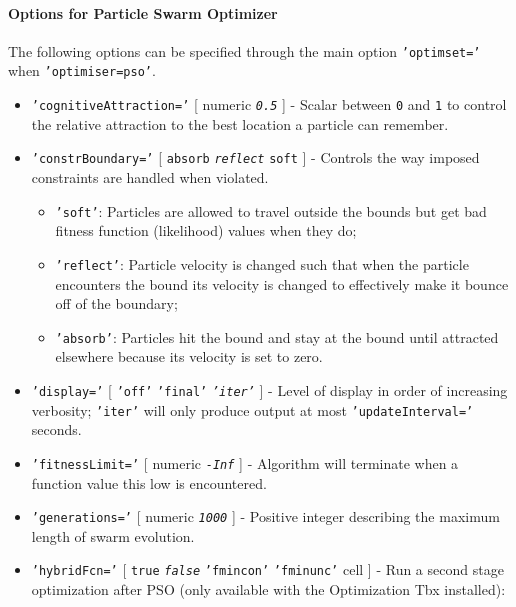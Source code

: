 \paragraph{Options for Particle Swarm
Optimizer}

The following options can be specified through the main option
\texttt{'optimset='} when \texttt{'optimiser=pso'}.

\begin{itemize}
\item
  \texttt{'cognitiveAttraction='} {[} numeric \textbar{}
  \emph{\texttt{0.5}} {]} - Scalar between \texttt{0} and \texttt{1} to
  control the relative attraction to the best location a particle can
  remember.
\item
  \texttt{'constrBoundary='} {[} \texttt{absorb} \textbar{}
  \emph{\texttt{reflect}} \textbar{} \texttt{soft} {]} - Controls the
  way imposed constraints are handled when violated.

  \begin{itemize}
  \item
    \texttt{'soft'}: Particles are allowed to travel outside the bounds
    but get bad fitness function (likelihood) values when they do;
  \item
    \texttt{'reflect'}: Particle velocity is changed such that when the
    particle encounters the bound its velocity is changed to effectively
    make it bounce off of the boundary;
  \item
    \texttt{'absorb'}: Particles hit the bound and stay at the bound
    until attracted elsewhere because its velocity is set to zero.
  \end{itemize}
\item
  \texttt{'display='} {[} \texttt{'off'} \textbar{} \texttt{'final'}
  \textbar{} \emph{\texttt{'iter'}} {]} - Level of display in order of
  increasing verbosity; \texttt{'iter'} will only produce output at most
  \texttt{'updateInterval='} seconds.
\item
  \texttt{'fitnessLimit='} {[} numeric \textbar{} \emph{\texttt{-Inf}}
  {]} - Algorithm will terminate when a function value this low is
  encountered.
\item
  \texttt{'generations='} {[} numeric \textbar{} \emph{\texttt{1000}}
  {]} - Positive integer describing the maximum length of swarm
  evolution.
\item
  \texttt{'hybridFcn='} {[} \texttt{true} \textbar{}
  \emph{\texttt{false}} \textbar{} \texttt{'fmincon'} \textbar{}
  \texttt{'fminunc'} \textbar{} cell {]} - Run a second stage
  optimization after PSO (only available with the Optimization Tbx
  installed):


\end{itemize}
